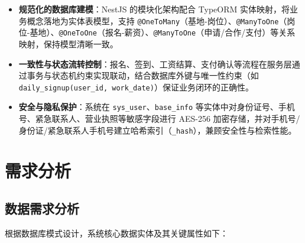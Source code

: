 \documentclass[UTF8,a4paper,12pt]{article}
\begin{document}
\begin{itemize}
    \item \textbf{规范化的数据库建模}：NestJS 的模块化架构配合 TypeORM 实体映射，将业务概念落地为实体表模型，支持 \texttt{@OneToMany}（基地-岗位）、\texttt{@ManyToOne}（岗位-基地）、\texttt{@OneToOne}（报名-薪资）、\texttt{@ManyToOne}（申请/合作/支付）等关系映射，保持模型清晰一致。
    
    \item \textbf{一致性与状态流转控制}：报名、签到、工资结算、支付确认等流程在服务层通过事务与状态机约束实现联动，结合数据库外键与唯一性约束（如 \texttt{daily\_signup(user\_id, work\_date)}）保证业务闭环的正确性。
    
    \item \textbf{安全与隐私保护}：系统在 \texttt{sys\_user}、\texttt{base\_info} 等实体中对身份证号、手机号、紧急联系人、营业执照等敏感字段进行 AES-256 加密存储，并对手机号/身份证/紧急联系人手机号建立哈希索引（\texttt{\_hash}），兼顾安全性与检索性能。
\end{itemize}


\section{需求分析}

\subsection{数据需求分析}
根据数据库模式设计，系统核心数据实体及其关键属性如下：
\end{document}
